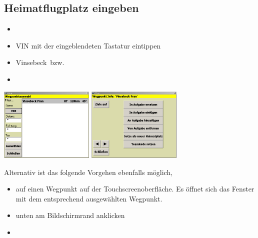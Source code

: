 \subsection{Heimatflugplatz eingeben}\label{Heimatflugplatz}
\begin{itemize}
\item {} \blink~\blink~\blink~ 
\item \textsf{VIN} mit der eingeblendeten Tastatur eintippen  \blink~ 
\item \textsf{Vinsebeck}~\dklick bzw.\  \blink~\far
\item {}
\end{itemize}
\begin{center}
\includegraphics[width=4.5cm]{Bilder/Wegpunkt-Auswahl2.png}\qquad%
\includegraphics[width=4.5cm]{Bilder/Wegpunkt-Info2.png}
\end{center}
Alternativ ist das folgende Vorgehen ebenfalls möglich,
\begin{itemize}
\item \dklick auf einen \textsf{Wegpunkt} auf der Touchscreenoberfläche. Es öffnet sich das Fenster  mit dem entsprechend ausgewählten Wegpunkt.
\item \far  unten am Bildschirmrand  anklicken
\item  {}
\end{itemize}

